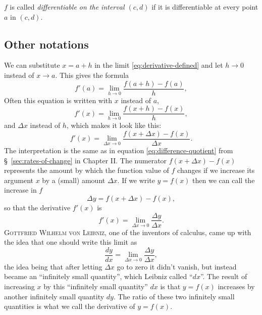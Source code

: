 \noindent
$f$ is called \emph{differentiable on the interval $(c, d)$} if it is
differentiable at every point $a$ in $(c,d)$.




\upshape




\subsection{Other notations}\label{sec:other-notations} 
We can substitute $x=a+h$ in the limit \eqref{eq:derivative-defined}
and let $h\to0$ instead of $x\to a$.  This gives the formula
\begin{equation}\label{eq:derivative-defined-a-plus-h}
  f'(a) = \lim_{h\to 0} \frac{f(a+h)-f(a)}{h},
\end{equation}
Often this equation is written with $x$ instead of $a$,
\begin{equation}\label{eq:derivative-defined-x-plus-h}
  f'(x) = \lim_{h\to 0} \frac{f(x+h)-f(x)}{h},
\end{equation}
and $\Delta x$ instead of $h$, which makes it look like this:
\begin{equation}\label{eq:derivative-defined-x-plus-Dx}
f'(x) = \lim_{\Delta x\to0} \frac{f(x+\Delta x) - f(x)}{\Delta x}.
\end{equation}
The interpretation is the same as in equation \eqref{eq:difference-quotient}
from \S~\ref{sec:rates-of-change} in Chapter II.  The numerator $f(x+\Delta x) -
f(x)$ represents the amount by which the function value of $f$ changes if we
increase its argument $x$ by a (small) amount $\Delta x$.  If we write $y=f(x)$
then we can call the increase in $f$
\[
\Delta y = f(x+\Delta x) - f(x),
\]
so that the derivative $f'(x)$ is
\[
f'(x) = \lim_{\Delta x\to0}\frac{\Delta y}{\Delta x}.
\]
\textsc{Gottfried Wilhelm von Leibniz}, one of the inventors of calculus,
came up with the idea that one should write this limit as
\[
\frac{dy}{dx}= \lim_{\Delta x\to0}\frac{\Delta y}{\Delta x},
\]
the idea being that after letting $\Delta x$ go to zero it didn't vanish,
but instead became an ``infinitely small quantity'', which Leibniz called
``$dx$''.  The result of increasing $x$ by this ``infinitely small quantity''
$dx$ is that $y=f(x)$ increases by another infinitely small quantity $dy$.
The ratio of these two infinitely small quantities is what we call the
derivative of $y=f(x)$.




